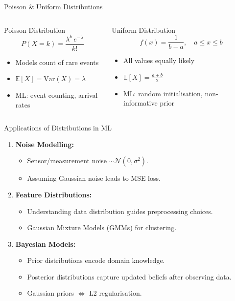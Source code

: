 \begin{frame}{Poisson \& Uniform Distributions}
\begin{columns}[T]
\begin{block}{Poisson Distribution}
\[
P(X=k) = \frac{\lambda^k\, e^{-\lambda}}{k!}
\]
\begin{itemize}
    \item Models count of rare events
    \item $\mathbb{E}[X] = \mathrm{Var}(X) = \lambda$
    \item ML: event counting, arrival rates
\end{itemize}
\end{block}
\begin{block}{Uniform Distribution}
\[
f(x) = \frac{1}{b-a}, \quad a \leq x \leq b
\]
\begin{itemize}
    \item All values equally likely
    \item $\mathbb{E}[X] = \frac{a+b}{2}$
    \item ML: random initialisation, non-informative prior
\end{itemize}
\end{block}
\end{columns}
\end{frame}

\begin{frame}{Applications of Distributions in ML}
\begin{enumerate}
    \item \textbf{Noise Modelling:}
    \begin{itemize}
        \item Sensor/measurement noise $\sim \mathcal{N}(0, \sigma^2)$.
        \item Assuming Gaussian noise leads to MSE loss.
    \end{itemize}
    \item \textbf{Feature Distributions:}
    \begin{itemize}
        \item Understanding data distribution guides preprocessing choices.
        \item Gaussian Mixture Models (GMMs) for clustering.
    \end{itemize}
    \item \textbf{Bayesian Models:}
    \begin{itemize}
        \item Prior distributions encode domain knowledge.
        \item Posterior distributions capture updated beliefs after observing data.
        \item Gaussian priors $\Leftrightarrow$ L2 regularisation.
    \end{itemize}
\end{enumerate}
\end{frame}

